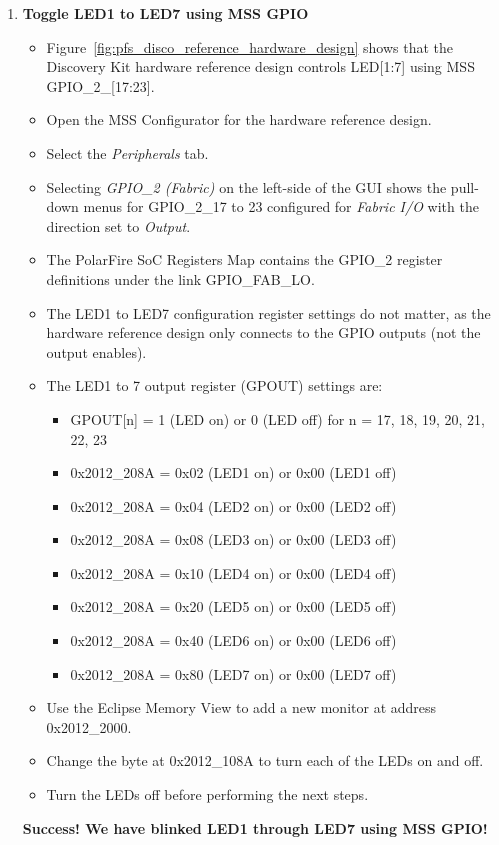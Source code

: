 \begin{enumerate}
\newpage
\item \textbf{Toggle LED1 to LED7 using MSS GPIO}
%
\begin{itemize}
\item Figure~\ref{fig:pfs_disco_reference_hardware_design} shows that the
Discovery Kit hardware reference design controls LED[1:7] using
MSS GPIO\_2\_[17:23].
\item Open the MSS Configurator for the hardware reference design.
\item Select the \emph{Peripherals} tab.
\item Selecting \emph{GPIO\_2 (Fabric)} on the left-side of the GUI shows the pull-down
menus for GPIO\_2\_17 to 23 configured for \emph{Fabric I/O} with the direction set to \emph{Output}.
\item The PolarFire SoC Registers Map contains the GPIO\_2 register definitions under
the link GPIO\_FAB\_LO.
\item The LED1 to LED7 configuration register settings do not matter, as the
hardware reference design only connects to the GPIO outputs (not the output enables).
%
\item The LED1 to 7 output register (GPOUT) settings are:
\begin{itemize}
\item GPOUT[n] = 1 (LED on) or 0 (LED off) for n = 17, 18, 19, 20, 21, 22, 23
\item 0x2012\_208A = 0x02 (LED1 on) or 0x00 (LED1 off)
\item 0x2012\_208A = 0x04 (LED2 on) or 0x00 (LED2 off)
\item 0x2012\_208A = 0x08 (LED3 on) or 0x00 (LED3 off)
\item 0x2012\_208A = 0x10 (LED4 on) or 0x00 (LED4 off)
\item 0x2012\_208A = 0x20 (LED5 on) or 0x00 (LED5 off)
\item 0x2012\_208A = 0x40 (LED6 on) or 0x00 (LED6 off)
\item 0x2012\_208A = 0x80 (LED7 on) or 0x00 (LED7 off)
\end{itemize}
%
\item Use the Eclipse Memory View to add a new monitor at address 0x2012\_2000.
\item Change the byte at 0x2012\_108A to turn each of the LEDs on and off.
\item Turn the LEDs off before performing the next steps.
\end{itemize}
\textcolor{OliveGreen}{\bf Success! We have blinked LED1 through LED7 using MSS GPIO!}


\end{enumerate}
